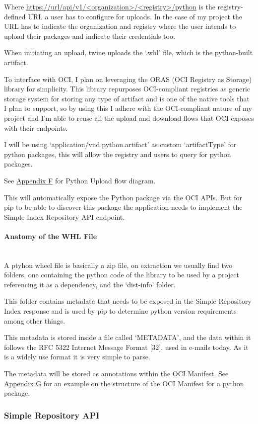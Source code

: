 \documentclass{article}
\newcommand{\subsubsubsection}[1]{\paragraph{#1}\mbox{}\\}
\begin{document}
  Where \url{https://url/api/v1/<organization>/<registry>/python} is the registry-defined URL a user has to configure for uploads. In the case of my project the URL has to indicate the organization and registry where the user intends to upload their packages and indicate their credentials too.

  When initiating an upload, twine uploads the `.whl' file, which is the python-built artifact.

  To interface with OCI, I plan on leveraging the ORAS (OCI Registry as Storage) library for simplicity. This library repurposes OCI-compliant registries as generic storage system for storing any type of artifact and is one of the native tools that I plan to support, so by using this I adhere with the OCI-compliant nature of my project and I'm able to reuse all the upload and download flows that OCI exposes with their endpoints.

  I will be using `application/vnd.python.artifact' as custom `artifactType' for python packages, this will allow the registry and users to query for python packages.

  See \hyperref[sec:appendix-f]{Appendix F} for Python Upload flow diagram.

  This will automatically expose the Python package via the OCI APIs. But for pip to be able to discover this package the application needs to implement the Simple Index Repository API endpoint.

  \subsubsubsection{Anatomy of the WHL File}

  A ptyhon wheel file is basically a zip file, on extraction we usually find two folders, one containing the python code of the library to be used by a project referencing it as a dependency, and the `dist-info' folder.

  This folder contains metadata that needs to be exposed in the Simple Repository Index response and is used by pip to determine python version requirements among other things.

  This metadata is stored inside a file called `METADATA', and the data within it follows the RFC 5322 Internet Message Format [32], used in e-mails today. As it is a widely use format it is very simple to parse.

  The metadata will be stored as annotations within the OCI Manifest. See \hyperref[sec:appendix-g]{Appendix G} for an example on the structure of the OCI Manifest for a python package.

  \subsubsection{Simple Repository API}
\end{document}
